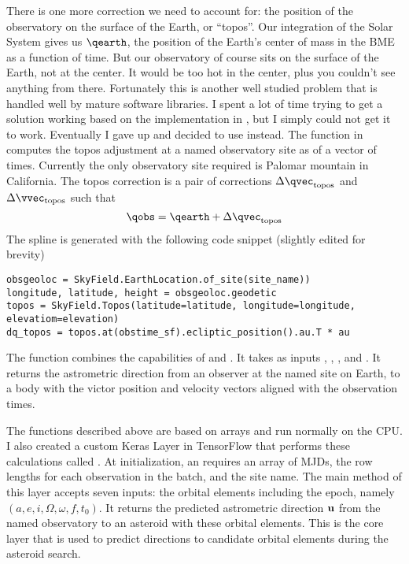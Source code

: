 There is one more correction we need to account for: the position of the observatory on the surface of the Earth, or ``topos''.
Our integration of the Solar System gives us $\qearth$, the position of the Earth's center of mass in the BME as a function of time.
But our observatory of course sits on the surface of the Earth, not at the center.
It would be too hot in the center, plus you couldn't see anything from there.
Fortunately this is another well studied problem that is handled well by mature software libraries.
I spent a lot of time trying to get a solution working based on the implementation in ,  but I simply could not get it to work.
Eventually I gave up and decided to use  instead.
The function  in  computes the topos adjustment at a named observatory site as of a vector of times.
Currently the only observatory site required is Palomar mountain in California.
The topos correction is a pair of corrections $\Delta \qvec_{\mathrm{topos}}$ and $\Delta \vvec_{\mathrm{topos}}$ such that
$$\qobs = \qearth + \Delta \qvec_{\mathrm{topos}}$$
The spline is generated with the following code snippet (slightly edited for brevity)
\begin{lstlisting}[style=CodeSnippet]
obsgeoloc = SkyField.EarthLocation.of_site(site_name))
longitude, latitude, height = obsgeoloc.geodetic
topos = SkyField.Topos(latitude=latitude, longitude=longitude, elevatiom=elevation)
dq_topos = topos.at(obstime_sf).ecliptic_position().au.T * au
\end{lstlisting}

The function  combines the capabilities of  and .
It takes as inputs , , ,  and .
It returns the astrometric direction from an observer at the named site on Earth, 
to a body with the victor position and velocity vectors aligned with the observation times.

The functions described above are based on  arrays and run normally on the CPU.
I also created a custom Keras Layer in TensorFlow that performs these calculations called .
At initialization, an  requires an array  of MJDs, the row lengths for each observation in the batch, and the site name.
The main  method of this layer accepts seven inputs: the orbital elements including the epoch, namely
$(a, e, i, \Omega, \omega, f, t_0)$.
It returns the predicted astrometric direction $\mathbf{u}$ from the named observatory to an asteroid with these orbital elements.
This is the core layer that is used to predict directions to candidate orbital elements during the asteroid search.


